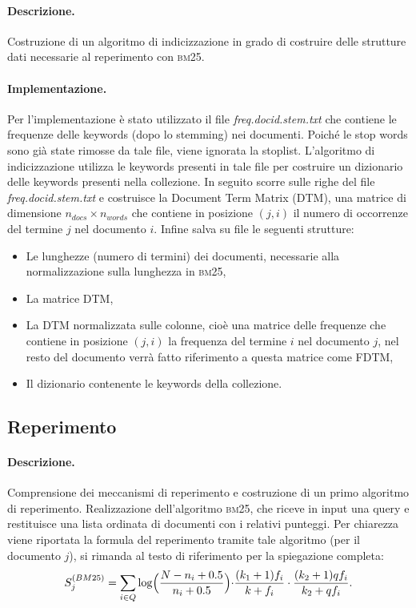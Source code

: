 \paragraph{\textbf{Descrizione.}} 
Costruzione di un algoritmo di indicizzazione in grado di costruire delle strutture dati necessarie al reperimento con \textsc{bm25}. 

\paragraph{\textbf{Implementazione.}}
Per l'implementazione \`e stato utilizzato il file \textit{freq.docid.stem.txt} che contiene le frequenze delle keywords (dopo lo stemming) nei documenti. Poich\'e le stop words sono gi\`a  state rimosse da tale file, viene ignorata la stoplist. L'algoritmo di indicizzazione utilizza le keywords presenti in tale file per costruire un dizionario delle keywords presenti nella collezione. In seguito scorre sulle righe del file \textit{freq.docid.stem.txt} e costruisce la Document Term Matrix (DTM), una matrice di  dimensione $n_{docs} \times n_{words}$ che contiene in posizione $(j,i)$ il numero di occorrenze del termine $j$ nel documento $i$. Infine salva su file le seguenti strutture:
\begin{itemize}
	\item Le lunghezze (numero di termini) dei documenti, necessarie alla normalizzazione sulla lunghezza in \textsc{bm25},
	\item La matrice DTM,
	\item La DTM normalizzata sulle colonne, cio\`e una matrice delle frequenze che contiene in posizione $(j,i)$ la frequenza del termine $i$ nel documento $j$, nel resto del documento verr\`a  fatto riferimento a questa matrice come FDTM,
	\item Il dizionario contenente le keywords della collezione.
\end{itemize}

\subsection{Reperimento}
\label{sec:metodi-di-reper}

\paragraph{\textbf{Descrizione.}}
Comprensione dei meccanismi di reperimento e costruzione di un primo algoritmo di reperimento.
Realizzazione dell'algoritmo \textsc{bm25}, che riceve in input una query e restituisce una lista ordinata di documenti con i relativi punteggi. Per chiarezza viene riportata la formula del reperimento tramite tale algoritmo (per il documento $j$), si rimanda al testo di riferimento \cite{melucci2013information} per la spiegazione completa:
\[ S^{(BM25)}_j = \sum\limits_{i \in Q}\log\Bigl(\frac{N-n_i+0.5}{n_i+0.5}\Bigl)\cdot\frac{(k_1+1)f_i}{k+f_i}\cdot\frac{(k_2+1)qf_i}{k_2+qf_i}. \]



